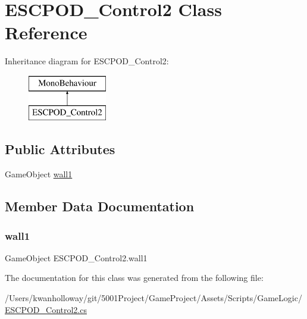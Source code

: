 \hypertarget{class_e_s_c_p_o_d___control2}{}\section{E\+S\+C\+P\+O\+D\+\_\+\+Control2 Class Reference}
\label{class_e_s_c_p_o_d___control2}
Inheritance diagram for E\+S\+C\+P\+O\+D\+\_\+\+Control2\+:\begin{figure}[H]
\begin{center}
\leavevmode
\includegraphics[height=2.000000cm]{class_e_s_c_p_o_d___control2}
\end{center}
\end{figure}
\subsection*{Public Attributes}
\begin{DoxyCompactItemize}
\item 
Game\+Object \hyperlink{class_e_s_c_p_o_d___control2_a5dc074a98094f8c896ba51e19f21c65d}{wall1}
\end{DoxyCompactItemize}


\subsection{Member Data Documentation}
\mbox{\label{class_e_s_c_p_o_d___control2_a5dc074a98094f8c896ba51e19f21c65d}} 
\subsubsection{\texorpdfstring{wall1}{wall1}}
{\footnotesize\ttfamily Game\+Object E\+S\+C\+P\+O\+D\+\_\+\+Control2.\+wall1}



The documentation for this class was generated from the following file\+:\begin{DoxyCompactItemize}
\item 
/\+Users/kwanholloway/git/5001\+Project/\+Game\+Project/\+Assets/\+Scripts/\+Game\+Logic/\hyperlink{_e_s_c_p_o_d___control2_8cs}{E\+S\+C\+P\+O\+D\+\_\+\+Control2.\+cs}\end{DoxyCompactItemize}
